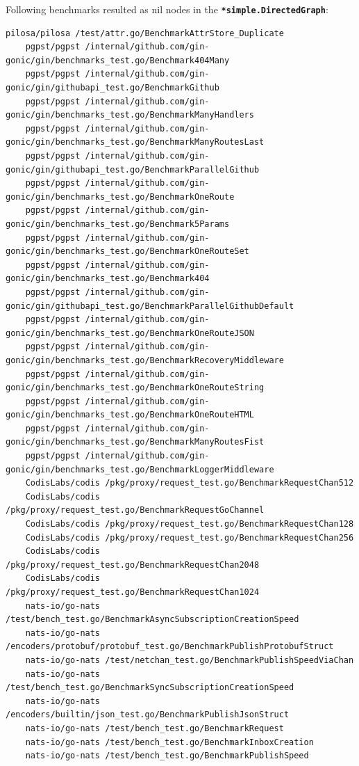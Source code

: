 \documentclass{seal_thesis}
\begin{document}
\label{incsv1butnotincsv2}
Following benchmarks resulted as nil nodes in the \texttt{\textbf{*simple.DirectedGraph}}:
\begin{lstlisting}[basicstyle=\tiny]
	pilosa/pilosa /test/attr.go/BenchmarkAttrStore_Duplicate
	pgpst/pgpst /internal/github.com/gin-gonic/gin/benchmarks_test.go/Benchmark404Many
	pgpst/pgpst /internal/github.com/gin-gonic/gin/githubapi_test.go/BenchmarkGithub
	pgpst/pgpst /internal/github.com/gin-gonic/gin/benchmarks_test.go/BenchmarkManyHandlers
	pgpst/pgpst /internal/github.com/gin-gonic/gin/benchmarks_test.go/BenchmarkManyRoutesLast
	pgpst/pgpst /internal/github.com/gin-gonic/gin/githubapi_test.go/BenchmarkParallelGithub
	pgpst/pgpst /internal/github.com/gin-gonic/gin/benchmarks_test.go/BenchmarkOneRoute
	pgpst/pgpst /internal/github.com/gin-gonic/gin/benchmarks_test.go/Benchmark5Params
	pgpst/pgpst /internal/github.com/gin-gonic/gin/benchmarks_test.go/BenchmarkOneRouteSet
	pgpst/pgpst /internal/github.com/gin-gonic/gin/benchmarks_test.go/Benchmark404
	pgpst/pgpst /internal/github.com/gin-gonic/gin/githubapi_test.go/BenchmarkParallelGithubDefault
	pgpst/pgpst /internal/github.com/gin-gonic/gin/benchmarks_test.go/BenchmarkOneRouteJSON
	pgpst/pgpst /internal/github.com/gin-gonic/gin/benchmarks_test.go/BenchmarkRecoveryMiddleware
	pgpst/pgpst /internal/github.com/gin-gonic/gin/benchmarks_test.go/BenchmarkOneRouteString
	pgpst/pgpst /internal/github.com/gin-gonic/gin/benchmarks_test.go/BenchmarkOneRouteHTML
	pgpst/pgpst /internal/github.com/gin-gonic/gin/benchmarks_test.go/BenchmarkManyRoutesFist
	pgpst/pgpst /internal/github.com/gin-gonic/gin/benchmarks_test.go/BenchmarkLoggerMiddleware
	CodisLabs/codis /pkg/proxy/request_test.go/BenchmarkRequestChan512
	CodisLabs/codis /pkg/proxy/request_test.go/BenchmarkRequestGoChannel
	CodisLabs/codis /pkg/proxy/request_test.go/BenchmarkRequestChan128
	CodisLabs/codis /pkg/proxy/request_test.go/BenchmarkRequestChan256
	CodisLabs/codis /pkg/proxy/request_test.go/BenchmarkRequestChan2048
	CodisLabs/codis /pkg/proxy/request_test.go/BenchmarkRequestChan1024
	nats-io/go-nats /test/bench_test.go/BenchmarkAsyncSubscriptionCreationSpeed
	nats-io/go-nats /encoders/protobuf/protobuf_test.go/BenchmarkPublishProtobufStruct
	nats-io/go-nats /test/netchan_test.go/BenchmarkPublishSpeedViaChan
	nats-io/go-nats /test/bench_test.go/BenchmarkSyncSubscriptionCreationSpeed
	nats-io/go-nats /encoders/builtin/json_test.go/BenchmarkPublishJsonStruct
	nats-io/go-nats /test/bench_test.go/BenchmarkRequest
	nats-io/go-nats /test/bench_test.go/BenchmarkInboxCreation
	nats-io/go-nats /test/bench_test.go/BenchmarkPublishSpeed

\end{lstlisting}
\end{document}
